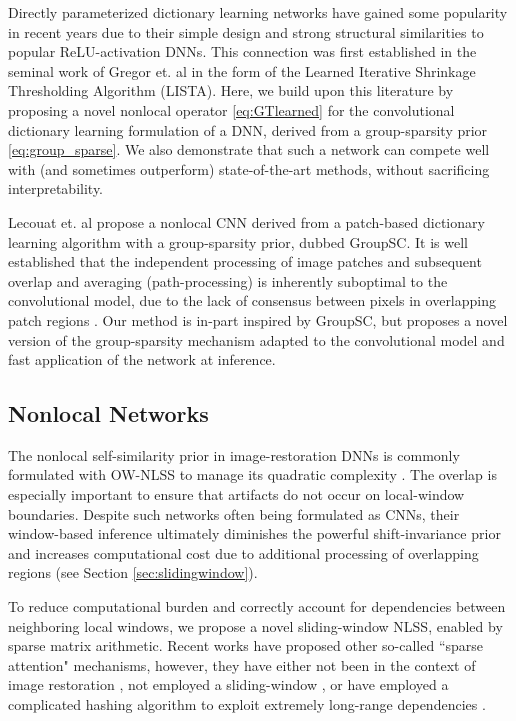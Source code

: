 \documentclass[lettersize,journal]{IEEEtran}
\newcommand{\soa}{state-of-the-art }
\begin{document}
Directly parameterized dictionary learning networks \cite{janjusevicCDLNet2022, janjusevicGDLNet2022, lecouat2020nonlocal, Sreter2018, Simon2019,
Scetbon2019DeepKD} have gained some popularity in recent years due to their
simple design and strong structural similarities to popular ReLU-activation
DNNs. This connection was first established in
the seminal work of Gregor et. al \cite{Gregor2010} in the form of the Learned
Iterative Shrinkage Thresholding Algorithm (LISTA). Here,
we build upon this literature by proposing a novel nonlocal operator \eqref{eq:GTlearned} for the
convolutional dictionary learning formulation of a DNN, derived from a group-sparsity prior \eqref{eq:group_sparse}. 
We also demonstrate that such a network can compete well with (and sometimes outperform)
\soa methods, without sacrificing interpretability. 

Lecouat et. al \cite{lecouat2020nonlocal} propose a nonlocal CNN derived from a
patch-based dictionary learning algorithm with a group-sparsity prior, dubbed
GroupSC. It is well established that the independent processing of image patches
and subsequent overlap and averaging (path-processing) is inherently suboptimal
to the convolutional model, due to the lack of consensus between pixels in
overlapping patch regions \cite{Simon2019}. Our method is in-part inspired by
GroupSC, but proposes a novel version of the group-sparsity mechanism adapted to
the convolutional model and fast application of the network at inference.

\subsection{Nonlocal Networks}
The nonlocal self-similarity prior in image-restoration DNNs is commonly
formulated with OW-NLSS to manage its quadratic complexity \cite{liu2018non,
lecouat2020nonlocal}. The overlap is especially important to ensure that
artifacts do not occur on local-window boundaries. Despite such networks often
being formulated as CNNs, their window-based inference ultimately diminishes the
powerful shift-invariance prior and increases computational cost due to
additional processing of overlapping regions (see Section
\ref{sec:slidingwindow}). 

To reduce computational burden and correctly account for dependencies between
neighboring local windows, we propose a novel sliding-window NLSS, enabled by
sparse matrix arithmetic. Recent works have proposed other so-called ``sparse
attention" mechanisms, however, they have either not been in the context of
image restoration \cite{child2019sparsetransformer}, not employed a
sliding-window \cite{dao2022flashattention}, or have employed a complicated
hashing algorithm to exploit extremely long-range dependencies
\cite{Mei_2021_CVPR}. 
\end{document}
